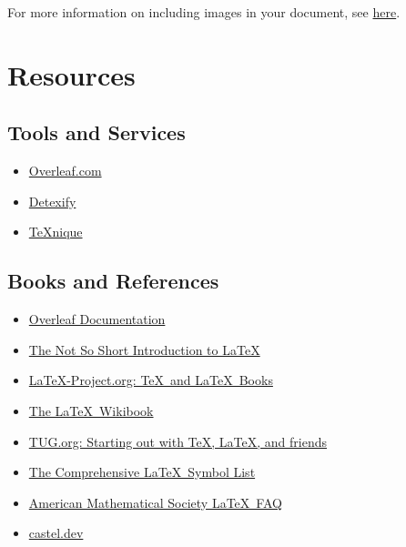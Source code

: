 For more information on including images in your document, see \href{https://en.wikibooks.org/wiki/LaTeX/Importing_Graphics}{here}.

\section{Resources}
\label{sec:resources}

\subsection{Tools and Services}
\label{sec:tools_and_services}
\begin{itemize}
    \item \href{https://www.overleaf.com/}{Overleaf.com}
    \item \href{https://detexify.kirelabs.org/classify.html}{Detexify}
    \item \href{https://texnique.xyz/}{\TeX{}nique}
\end{itemize}

\subsection{Books and References}
\label{sec:books_and_references}
\begin{itemize}
    \item \href{https://www.overleaf.com/learn}{Overleaf Documentation}
    \item \href{https://tobi.oetiker.ch/lshort/lshort.pdf}{The Not So Short Introduction to \LaTeX}
    \item \href{https://www.latex-project.org/help/books/}{LaTeX-Project.org: \TeX\ and \LaTeX\ Books}
    \item \href{https://en.wikibooks.org/wiki/LaTeX}{The \LaTeX\ Wikibook}
    \item \href{https://tug.org/begin.html}{TUG.org: Starting out with \TeX, \LaTeX, and friends}
    \item \href{https://ctan.org/pkg/comprehensive}{The Comprehensive \LaTeX\ Symbol List}
    \item \href{https://www.ams.org/publications/authors/faq/author-faq}{American Mathematical Society \LaTeX\ FAQ}
    \item \href{https://castel.dev/}{castel.dev}
\end{itemize}

